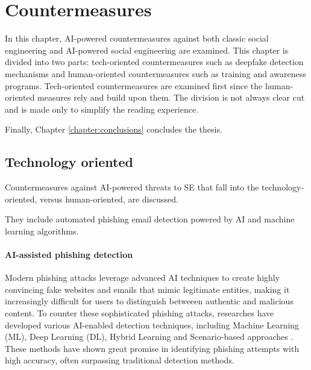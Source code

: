 



\chapter{Countermeasures\label{chapter:countermeasures}}
\begin{comment}


\end{comment}

In this chapter, AI-powered countermeasures against both classic social engineering and AI-powered social engineering are examined. This chapter is divided into two parts: tech-oriented countermeasures such as deepfake detection mechanisms and human-oriented countermeasures such as training and awareness programs. Tech-oriented countermeasures are examined first since the human-oriented measures rely and build upon them. The division is not always clear cut and is made only to simplify the reading experience.

Finally, Chapter \ref{chapter:conclusions} concludes the thesis.


\section{Technology oriented}
\begin{comment}
    
    - 

\end{comment}

Countermeasures against AI-powered threats to SE that fall into the technology-oriented, versus human-oriented, are discussed.

They include automated phishing email detection powered by AI and machine learning algorithms.

\subsubsection{AI-assisted phishing detection}

Modern phishing attacks leverage advanced AI techniques to create highly convincing fake websites and emails that mimic legitimate entities, making it increasingly difficult for users to distinguish betweeen authentic and malicious content. To counter these sophisticated phishing attacks, researches have developed various AI-enabled detection techniques, including Machine Learning (ML), Deep Learning (DL), Hybrid Learning and Scenario-based approaches \citep{basitComprehensiveSurveyAIenabledPhishingAttacks2021}. These methods have shown great promise in identifying phishing attempts with high accuracy, often surpassing traditional detection methods.

